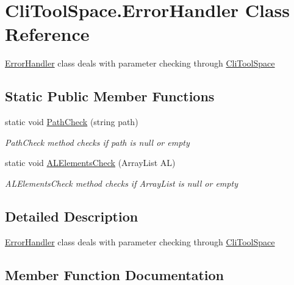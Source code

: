 \hypertarget{class_cli_tool_space_1_1_error_handler}{}\section{Cli\+Tool\+Space.\+Error\+Handler Class Reference}
\label{class_cli_tool_space_1_1_error_handler}


\mbox{\hyperlink{class_cli_tool_space_1_1_error_handler}{Error\+Handler}} class deals with parameter checking through \mbox{\hyperlink{namespace_cli_tool_space}{Cli\+Tool\+Space}}  


\subsection*{Static Public Member Functions}
\begin{DoxyCompactItemize}
\item 
static void \mbox{\hyperlink{class_cli_tool_space_1_1_error_handler_a08cc2e357575ec2829f5f5ca94ea8d36}{Path\+Check}} (string path)
\begin{DoxyCompactList}\small\item\em Path\+Check method checks if path is null or empty \end{DoxyCompactList}\item 
static void \mbox{\hyperlink{class_cli_tool_space_1_1_error_handler_a5b2cfca97006471e3d972644883877b8}{A\+L\+Elements\+Check}} (Array\+List AL)
\begin{DoxyCompactList}\small\item\em A\+L\+Elements\+Check method checks if Array\+List is null or empty \end{DoxyCompactList}\end{DoxyCompactItemize}


\subsection{Detailed Description}
\mbox{\hyperlink{class_cli_tool_space_1_1_error_handler}{Error\+Handler}} class deals with parameter checking through \mbox{\hyperlink{namespace_cli_tool_space}{Cli\+Tool\+Space}} 



\subsection{Member Function Documentation}
\mbox{\label{class_cli_tool_space_1_1_error_handler_a5b2cfca97006471e3d972644883877b8}} 
